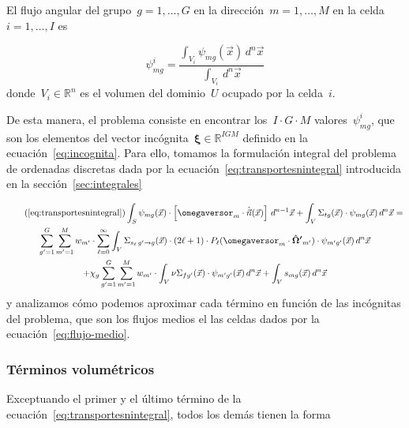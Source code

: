 \begin{definicion}
El flujo angular del grupo~$g=1,\dots,G$ en la dirección~$m=1,\dots,M$ en la celda~$i=1,\dots,I$ es

\begin{equation}\label{eq:flujo-medio}
 \psi_{mg}^i = \frac{\displaystyle \int_{V_i} \psi_{mg}(\vec{x}) \, d^n\vec{x}}{\displaystyle \int_{V_i} \, d^n\vec{x}}
\end{equation}
%
donde~$V_i \in \mathbb{R}^n$ es el volumen del dominio~$U$ ocupado por la  celda~$i$.
\end{definicion}


De esta manera, el problema consiste en encontrar los~$I \cdot G \cdot M$ valores~$\psi_{mg}^i$, que son los elementos del vector incógnita~$\boldsymbol{\xi} \in \mathbb{R}^{IGM}$ definido en la ecuación~\eqref{eq:incognita}. Para ello, tomamos la formulación integral del problema de ordenadas discretas dada por la ecuación~\eqref{eq:transportesnintegral} introducida en la sección~\ref{sec:integrales}

\begin{multline}\tag{\ref{eq:transportesnintegral}}
 \int_S \psi_{mg}(\vec{x}) \cdot \left[ \omegaversor_m \cdot \hat{\vec{n}}(\vec{x})\right]  \, d^{n-1}\vec{x}
 +
 \int_V \Sigma_{t g}(\vec{x}) \cdot \psi_{mg}(\vec{x}) \, d^n\vec{x} = \\
 \sum_{g^\prime=1}^G \sum_{m^\prime=1}^M  w_{m^\prime} \cdot  \sum_{\ell=0}^\infty 
\int_V \Sigma_{s_\ell \,g^\prime \rightarrow g}(\vec{x}) \cdot (2\ell+1) \cdot P_\ell (\omegaversor_m \cdot \boldsymbol{\hat{\Omega}^\prime}_{m^\prime}) \cdot \psi_{m^\prime g^\prime}(\vec{x}) \, d^n\vec{x} \\
+
 \chi_g  \sum_{g^\prime=1}^G \sum_{m^\prime=1}^M  w_{m^\prime} \cdot \int_V \nu\Sigma_{fg^\prime}(\vec{x}) \cdot \psi_{m^\prime g^\prime}(\vec{x}) \, d^n\vec{x}
+
 \int_V s_{mg}(\vec{x}) \, d^n\vec{x}
\end{multline}
%
y analizamos cómo podemos aproximar cada término en función de las incógnitas del problema, que son los flujos medios el las celdas dados por la ecuación~\eqref{eq:flujo-medio}.

\subsubsection{Términos volumétricos} %

Exceptuando el primer y el último término de la ecuación~\eqref{eq:transportesnintegral}, todos los demás tienen la forma

